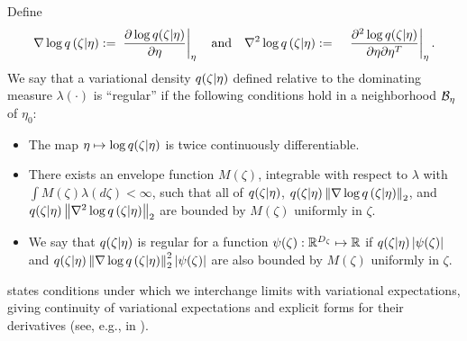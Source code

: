 \begin{assu}
%
Define
%
\begin{align*}
%
\lqgrad{\zeta \vert \eta} :={}&
    \fracat{\partial \log \q(\zeta \vert \eta)}{\partial \eta}{\eta}
    \mathtxt{and}
%
\lqhess{\zeta \vert \eta} :={}&
    \fracat{\partial^2 \log \q(\zeta \vert \eta)}
           {\partial \eta \partial \eta^T}{\eta}.
%
\end{align*}
%
We say that a variational density $q(\zeta \vert \eta)$ defined relative to the
dominating measure $\lambda(\cdot)$ is ``regular'' if the following conditions
hold in a neighborhood $\mathcal{B}_\eta$ of $\eta_0$:
%
\begin{itemize}
%
\item  The map $\eta \mapsto \log q(\zeta \vert \eta)$ is twice continuously
differentiable.
%
\item  There exists an envelope function $M(\zeta)$, integrable with respect to
$\lambda$ with $\int M(\zeta) \lambda(d\zeta) < \infty$, such that
all of $q(\zeta \vert \eta)$, $q(\zeta \vert \eta) \left\Vert{\nabla \log q}\left(\zeta \vert \eta\right)\right\Vert_2$,
and $q(\zeta \vert \eta) \left\Vert{\nabla^2 \log q}\left(\zeta \vert \eta\right)\right\Vert_2$ are
bounded by $M(\zeta)$ uniformly in $\zeta$.
%
\item We say that $q(\zeta \vert \eta)$ is regular for a function $\psi(\zeta):
\mathbb{R}^{D_{\zeta}} \mapsto \mathbb{R}$ if $q(\zeta \vert \eta)
\left|\psi(\zeta)\right|$ and $q(\zeta \vert \eta) \left\Vert{\nabla \log q}\left(\zeta \vert
\eta\right)\right\Vert_2^2 \left|\psi(\zeta)\right|$ are also bounded by $M(\zeta)$ uniformly in
$\zeta$.
%
\end{itemize}
%
%
\end{assu}
%

 states conditions under which we interchange limits with
variational  expectations, giving continuity of variational expectations and
explicit forms for their derivatives (see, e.g.,  in ).


